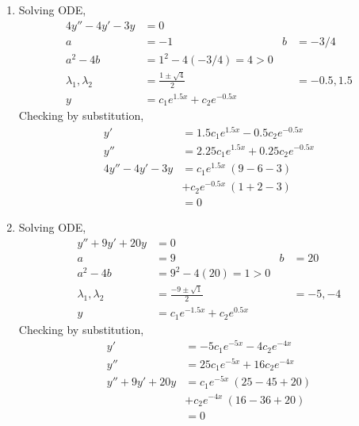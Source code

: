 \begin{enumerate}
    \item Solving ODE,
          \begin{align}
              4y'' -4y' - 3y           & = 0                                \\
              a                        & = -1                             &
              b                        & = -3/4                             \\
              a^{2} - 4b               & = 1^{2} - 4(-3/4) = 4 > 0          \\
              \lambda_{1}, \lambda_{2} & = \frac{1 \pm \sqrt{4}}{2}       &
                                       & = -0.5, 1.5                        \\
              y                        & = c_{1}e^{1.5x} + c_{2}e^{-0.5x}
          \end{align}
          Checking by substitution,
          \begin{align}
              y'              & = 1.5c_{1}e^{1.5x} - 0.5c_{2}e^{-0.5x}   \\
              y''             & = 2.25c_{1}e^{1.5x} + 0.25c_{2}e^{-0.5x} \\
              4y'' - 4y' - 3y & = c_{1}e^{1.5x}\ (9 - 6  -3)             \\
                              & + c_{2}e^{-0.5x}\ (1 + 2 - 3)            \\
                              & = 0
          \end{align}

    \item Solving ODE,
          \begin{align}
              y'' + 9y' + 20y          & = 0                                \\
              a                        & = 9                              &
              b                        & = 20                               \\
              a^{2} - 4b               & = 9^{2} - 4(20) = 1 > 0            \\
              \lambda_{1}, \lambda_{2} & = \frac{-9 \pm \sqrt{1}}{2}      &
                                       & = -5, -4                           \\
              y                        & = c_{1}e^{-1.5x} + c_{2}e^{0.5x}
          \end{align}
          Checking by substitution,
          \begin{align}
              y'              & = -5c_{1}e^{-5x} - 4c_{2}e^{-4x}  \\
              y''             & = 25c_{1}e^{-5x} + 16c_{2}e^{-4x} \\
              y'' + 9y' + 20y & = c_{1}e^{-5x}\ (25 - 45 + 20)    \\
                              & + c_{2}e^{-4x}\ (16 - 36 + 20)    \\
                              & = 0
          \end{align}


\end{enumerate}

